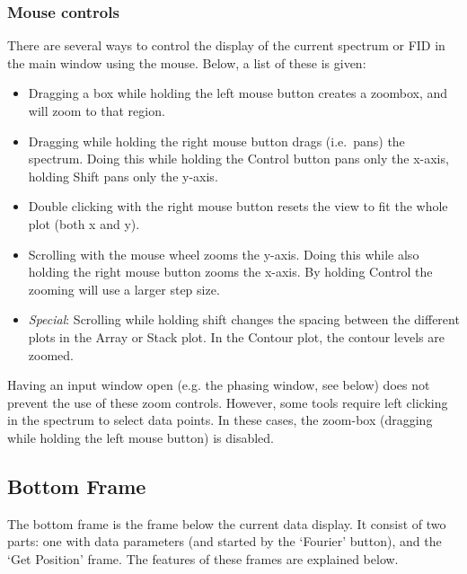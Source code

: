 \documentclass[11pt,a4paper]{article}
\begin{document}
\subsubsection{Mouse controls}
There are several ways to control the display of the current spectrum or FID in the main window
using the mouse. Below, a list of these is given:

\begin{itemize}
\item Dragging a box while holding the left mouse button creates a zoombox, and will zoom to that region.
\item Dragging while holding the right mouse button drags (i.e.\ pans) the spectrum. Doing this while holding the Control button pans only the x-axis, holding Shift pans only the y-axis.
\item Double clicking with the right mouse button resets the view to fit the whole plot (both x and y).
\item Scrolling with the mouse wheel zooms the y-axis. Doing this while also holding the right mouse button zooms the x-axis. By holding Control the zooming will use a larger step size.
\item \textit{Special}: Scrolling while holding shift changes the spacing between the different plots in the Array or Stack plot. In the Contour plot, the contour levels are zoomed.
\end{itemize}

Having an input window open (e.g. the phasing window, see below) does not prevent the use of these zoom controls. However, some tools require left clicking in the spectrum to select data points. In these cases, the zoom-box (dragging while holding the left mouse button) is disabled.

\subsection{Bottom Frame}
The bottom frame is the frame below the current data display. It consist of two parts: one with data parameters (and started by the `Fourier' button), and the `Get Position' frame. The features of these frames are explained below.
\end{document}
